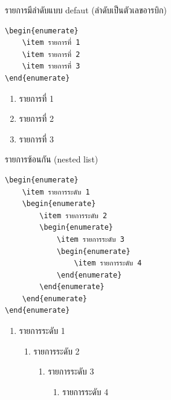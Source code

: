 \begin{exampleBox}[sidebyside]{รายการมีลำดับแบบ defaut (ลำดับเป็นตัวเลขอารบิก)}
\begin{lstlisting}[frame=none,language={[LaTeX]TeX}]
\begin{enumerate}
    \item รายการที่ 1
    \item รายการที่ 2
    \item รายการที่ 3
\end{enumerate}
\end{lstlisting}
\tcblower
\begin{enumerate}[noitemsep]
    \item รายการที่ 1
    \item รายการที่ 2
    \item รายการที่ 3
\end{enumerate}
\end{exampleBox}

\begin{exampleBox}[sidebyside]{รายการซ้อนกัน (nested list)}
\small
\begin{lstlisting}[frame=none,language={[LaTeX]TeX}]
\begin{enumerate}
    \item รายการระดับ 1
    \begin{enumerate}
        \item รายการระดับ 2
        \begin{enumerate}
            \item รายการระดับ 3
            \begin{enumerate}
                \item รายการระดับ 4
            \end{enumerate}
        \end{enumerate}
    \end{enumerate}
\end{enumerate}
\end{lstlisting}
\tcblower
\small
\begin{enumerate}
    \item รายการระดับ 1
    \begin{enumerate}
        \item รายการระดับ 2
        \begin{enumerate}
            \item รายการระดับ 3
            \begin{enumerate}
                \item รายการระดับ 4
            \end{enumerate}
        \end{enumerate}
    \end{enumerate}
\end{enumerate}
\end{exampleBox}

